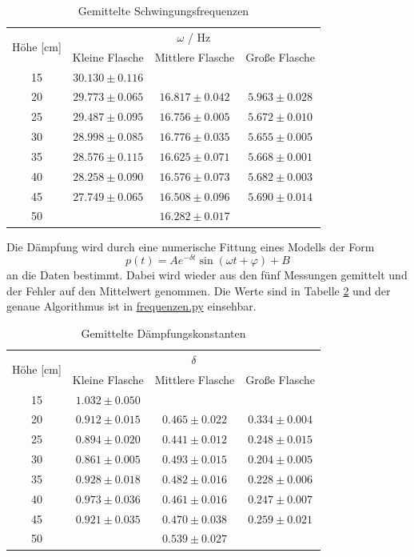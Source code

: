 \documentclass[a4paper, 12pt]{scrartcl}
\begin{document}
\begin{table}[H]
\centering
\begin{tabular}{c|c|c|c}
\multirow{2}{*}{Höhe [cm]} & \multicolumn{3}{c}{$\omega$ / Hz} \\
\cline{2-4}
& Kleine Flasche & Mittlere Flasche & Große Flasche \\
\hline
15 & $30.130 \pm 0.116$ &  &  \\
20 & $29.773 \pm 0.065$ & $16.817 \pm 0.042$ & $5.963 \pm 0.028$ \\
25 & $29.487 \pm 0.095$ & $16.756 \pm 0.005$ & $5.672 \pm 0.010$ \\
30 & $28.998 \pm 0.085$ & $16.776 \pm 0.035$ & $5.655 \pm 0.005$ \\
35 & $28.576 \pm 0.115$ & $16.625 \pm 0.071$ & $5.668 \pm 0.001$ \\
40 & $28.258 \pm 0.090$ & $16.576 \pm 0.073$ & $5.682 \pm 0.003$ \\
45 & $27.749 \pm 0.065$ & $16.508 \pm 0.096$ & $5.690 \pm 0.014$ \\
50 & & $16.282 \pm 0.017$ & 
\end{tabular}
\caption{Gemittelte Schwingungsfrequenzen}
\label{tab:freq}
\end{table}


Die Dämpfung wird durch eine numerische Fittung eines Modells der Form 
$$p(t) = A e^{-\delta t}\sin(\omega t +\varphi) + B$$ 
an die Daten bestimmt. Dabei wird wieder aus den fünf Messungen gemittelt und der Fehler auf den Mittelwert genommen. Die Werte sind in Tabelle \ref{tab:delta} und der genaue Algorithmus ist in \url{frequenzen.py} einsehbar.

\begin{table}[H]
\centering
\begin{tabular}{c|c|c|c}
\multirow{2}{*}{Höhe [cm]} & \multicolumn{3}{c}{$\delta$} \\
\cline{2-4}
& Kleine Flasche & Mittlere Flasche & Große Flasche \\
\hline
15 & $1.032 \pm 0.050$ & & \\
20 & $0.912 \pm 0.015$ & $0.465 \pm 0.022$ & $0.334 \pm 0.004$ \\
25 & $0.894 \pm 0.020$ & $0.441 \pm 0.012$ & $0.248 \pm 0.015$ \\
30 & $0.861 \pm 0.005$ & $0.493 \pm 0.015$ & $0.204 \pm 0.005$ \\
35 & $0.928 \pm 0.018$ & $0.482 \pm 0.016$ & $0.228 \pm 0.006$ \\
40 & $0.973 \pm 0.036$ & $0.461 \pm 0.016$ & $0.247 \pm 0.007$ \\
45 & $0.921 \pm 0.035$ & $0.470 \pm 0.038$ & $0.259 \pm 0.021$ \\
50 & & $0.539 \pm 0.027$ & 
\end{tabular}
\caption{Gemittelte Dämpfungskonstanten}
\label{tab:delta}
\end{table}
\end{document}
